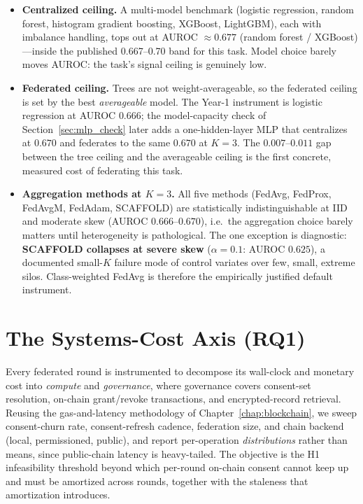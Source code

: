 \documentclass[12pt]{report}
\begin{document}
\begin{itemize}
  \item \textbf{Centralized ceiling.} A multi-model benchmark (logistic
        regression, random forest, histogram gradient boosting, XGBoost,
        LightGBM), each with imbalance handling, tops out at AUROC
        $\approx 0.677$ (random forest / XGBoost)---inside the published
        0.667--0.70 band for this task. Model choice barely moves AUROC: the
        task's signal ceiling is genuinely low.
  \item \textbf{Federated ceiling.} Trees are not weight-averageable, so the
        federated ceiling is set by the best \emph{averageable} model. The
        Year-1 instrument is logistic regression at AUROC $0.666$; the
        model-capacity check of Section~\ref{sec:mlp_check} later adds a
        one-hidden-layer MLP that centralizes at $0.670$ and federates to the
        same $0.670$ at $K{=}3$. The $0.007$--$0.011$ gap between the tree
        ceiling and the averageable ceiling is the first concrete, measured cost
        of federating this task.
  \item \textbf{Aggregation methods at $K{=}3$.} All five methods (FedAvg,
        FedProx, FedAvgM, FedAdam, SCAFFOLD) are statistically indistinguishable
        at IID and moderate skew (AUROC $0.666$--$0.670$), i.e.\ the aggregation
        choice barely matters until heterogeneity is pathological. The one
        exception is diagnostic: \textbf{SCAFFOLD collapses at severe skew}
        ($\alpha{=}0.1$: AUROC $0.625$), a documented small-$K$ failure mode of
        control variates over few, small, extreme silos. Class-weighted FedAvg
        is therefore the empirically justified default instrument.
\end{itemize}

\section{The Systems-Cost Axis (RQ1)}
\label{sec:cost_axis}

Every federated round is instrumented to decompose its wall-clock and monetary
cost into \emph{compute} and \emph{governance}, where governance covers
consent-set resolution, on-chain grant/revoke transactions, and encrypted-record
retrieval. Reusing the gas-and-latency methodology of
Chapter~\ref{chap:blockchain}, we sweep consent-churn rate, consent-refresh
cadence, federation size, and chain backend (local, permissioned, public), and
report per-operation \emph{distributions} rather than means, since public-chain
latency is heavy-tailed. The objective is the H1 infeasibility threshold beyond
which per-round on-chain consent cannot keep up and must be amortized across
rounds, together with the staleness that amortization introduces.
\end{document}
